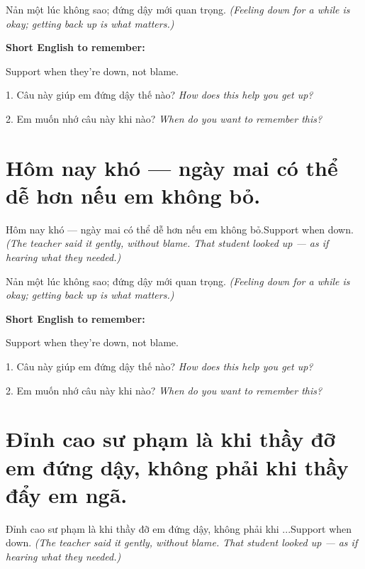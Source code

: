 \begin{baihoc}
Nản một lúc không sao; đứng dậy mới quan trọng.
\textit{(Feeling down for a while is okay; getting back up is what matters.)}
\end{baihoc}

\begin{ghinhoanh}
\textbf{Short English to remember:}

Support when they're down, not blame.

\end{ghinhoanh}

\begin{tuhocnhanh}
1. Câu này giúp em đứng dậy thế nào? \textit{How does this help you get up?}

2. Em muốn nhớ câu này khi nào? \textit{When do you want to remember this?}
\end{tuhocnhanh}
\ngancach


\section{Hôm nay khó — ngày mai có thể dễ hơn nếu em không bỏ.}
\begin{truyen}{Hôm nay khó — ngày mai có thể dễ hơn nếu em không bỏ.}{Support when down.}
\textit{(The teacher said it gently, without blame. That student looked up — as if hearing what they needed.)}
\end{truyen}

\begin{baihoc}
Nản một lúc không sao; đứng dậy mới quan trọng.
\textit{(Feeling down for a while is okay; getting back up is what matters.)}
\end{baihoc}

\begin{ghinhoanh}
\textbf{Short English to remember:}

Support when they're down, not blame.

\end{ghinhoanh}

\begin{tuhocnhanh}
1. Câu này giúp em đứng dậy thế nào? \textit{How does this help you get up?}

2. Em muốn nhớ câu này khi nào? \textit{When do you want to remember this?}
\end{tuhocnhanh}
\ngancach


\section{Đỉnh cao sư phạm là khi thầy đỡ em đứng dậy, không phải khi thầy đẩy em ngã.}
\begin{truyen}{Đỉnh cao sư phạm là khi thầy đỡ em đứng dậy, không phải khi ...}{Support when down.}
\textit{(The teacher said it gently, without blame. That student looked up — as if hearing what they needed.)}
\end{truyen}

